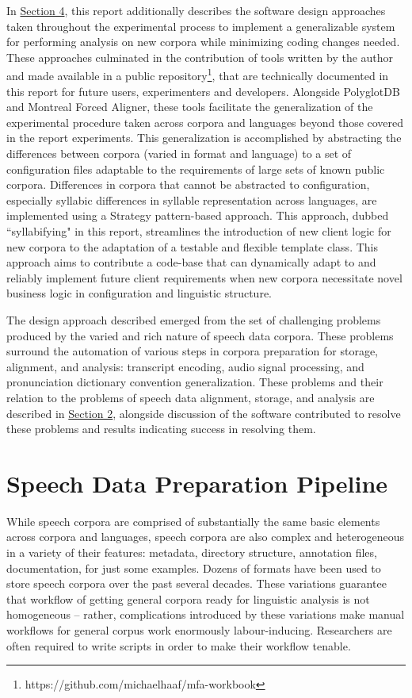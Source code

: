 \documentclass[11pt]{article}
\begin{document}
In \hyperlink{section.4}{Section 4}, this report additionally describes the software design approaches taken throughout the experimental process to implement a generalizable system for performing analysis on new corpora while minimizing coding changes needed. These approaches culminated in the contribution of tools written by the author and made available in a public repository\footnote{https://github.com/michaelhaaf/mfa-workbook}, that are technically documented in this report for future users, experimenters and developers. Alongside PolyglotDB and Montreal Forced Aligner, these tools facilitate the generalization of the experimental procedure taken across corpora and languages beyond those covered in the report experiments. This generalization is accomplished by abstracting the differences between corpora (varied in format and language) to a set of configuration files adaptable to the requirements of large sets of known public corpora. Differences in corpora that cannot be abstracted to configuration, especially syllabic differences in syllable representation across languages, are implemented using a Strategy pattern-based approach. This approach, dubbed ``syllabifying" in this report, streamlines the introduction of new client logic for new corpora to the adaptation of a testable and flexible template class. This approach aims to contribute a code-base that can dynamically adapt to and reliably implement future client requirements when new corpora necessitate novel business logic in configuration and linguistic structure.

The design approach described emerged from the set of challenging problems produced by the varied and rich nature of speech data corpora. These problems surround the automation of various steps in corpora preparation for storage, alignment, and analysis: transcript encoding, audio signal processing, and pronunciation dictionary convention generalization. These problems and their relation to the problems of speech data alignment, storage, and analysis are described in \hyperlink{section.2}{Section 2}, alongside discussion of the software contributed to resolve these problems and results indicating success in resolving them.

\section{Speech Data Preparation Pipeline}

While speech corpora are comprised of substantially the same basic elements across corpora and languages, speech corpora are also complex and heterogeneous in a variety of their features: metadata, directory structure, annotation files, documentation, for just some examples. Dozens of formats have been used to store speech corpora over the past several decades. These variations guarantee that workflow of getting general corpora ready for linguistic analysis is not homogeneous -- rather, complications introduced by these variations make manual workflows for general corpus work enormously labour-inducing. Researchers are often required to write scripts in order to make their workflow tenable.
\end{document}
